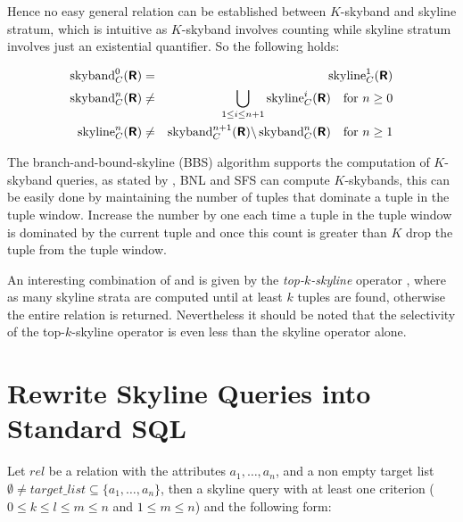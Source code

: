 \noindent
Hence no easy general relation can be established between $K$-skyband
and skyline stratum, which is intuitive as $K$-skyband involves counting
while skyline stratum involves just an existential quantifier.
So the following holds:


\begin{eqnarray}
\skyband_C^0(\relation{R}) &=& \skyline_C^1(\relation{R}) \label{equ:skyband} \\
\skyband_C^n(\relation{R}) &\not=& \bigunion_{1 \le i \le n+1} \skyline_C^i(\relation{R}) \quad \textnormal{for}\ n \ge 0\label{equ:skybandgeneral} \\
\skyline_C^n(\relation{R}) &\not=& \skyband_C^{n+1}(\relation{R}) \difference \skyband_C^n(\relation{R}) \quad \textnormal{for}\ n \ge 1
\end{eqnarray}

The branch-and-bound-skyline (BBS) algorithm \citep{Papadias2005} supports the
computation of $K$-skyband queries, as stated by \citet{Papadias2005},
BNL and SFS can compute $K$-skybands, this can be easily done by
maintaining the number of tuples that dominate a tuple in the tuple
window. Increase the number by one each time a tuple in the tuple
window is dominated by the current tuple and once this count is
greater than $K$ drop the tuple from the tuple window.


An interesting combination of  and
 is given by the
\emph{top-$k$-skyline} operator
\citep{Brando2007, Goncalves2005a, Goncalves2005}, where as many 
skyline strata are computed until at least $k$ tuples are found, otherwise
the entire relation is returned.  Nevertheless it should be noted that
the selectivity of the top-$k$-skyline operator is even less
than the skyline operator alone.


\section{Rewrite Skyline Queries into Standard SQL}
\label{sec:rewrite-to-sql}

Let $rel$ be a relation with the attributes $a_1, \ldots, a_n$, and a non
empty target list $\emptyset \not= target\_list \subseteq \{a_1,
\ldots, a_n\}$, then a skyline query with at least one criterion ($0
\le k \le l \le m \le n$ and $1 \le m \le n$) and the following form:

